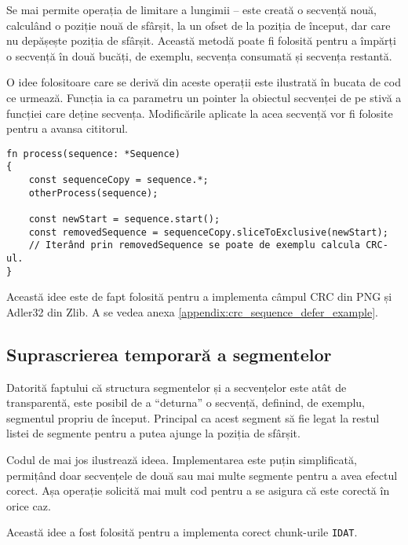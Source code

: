 \documentclass[a4paper,12pt]{report}
\begin{document}
Se mai permite operația de limitare a lungimii -- este creată o secvență nouă,
calculând o poziție nouă de sfârșit, la un ofset de la poziția de început,
dar care nu depășește poziția de sfârșit.
Această metodă poate fi folosită pentru a împărți o secvență în două bucăți, de exemplu,
secvența consumată și secvența restantă.

O idee folositoare care se derivă din aceste operații este ilustrată în bucata de cod ce urmează.
Funcția ia ca parametru un pointer la obiectul secvenței de pe stivă a funcției care deține secvența.
Modificările aplicate la acea secvență vor fi folosite pentru a avansa cititorul.

\begin{verbatim}
fn process(sequence: *Sequence)
{
    const sequenceCopy = sequence.*;
    otherProcess(sequence);

    const newStart = sequence.start();
    const removedSequence = sequenceCopy.sliceToExclusive(newStart);
    // Iterând prin removedSequence se poate de exemplu calcula CRC-ul.
}
\end{verbatim}

Această idee este de fapt folosită pentru a implementa câmpul \ac{CRC} din \ac{PNG} și Adler32 din Zlib.
A se vedea anexa \ref{appendix:crc_sequence_defer_example}.

\subsection{Suprascrierea temporară a segmentelor}

Datorită faptului că structura segmentelor și a secvențelor este atât de transparentă,
este posibil de a ``deturna'' o secvență, definind, de exemplu, segmentul propriu de început.
Principal ca acest segment să fie legat la restul listei de segmente pentru a putea ajunge la poziția de sfârșit.

Codul de mai jos ilustrează ideea.
Implementarea este puțin simplificată,
permițând doar secvențele de două sau mai multe segmente pentru a avea efectul corect.
Așa operație solicită mai mult cod pentru a se asigura că este corectă în orice caz.

Această idee a fost folosită pentru a implementa corect chunk-urile \texttt{IDAT}.
\end{document}
